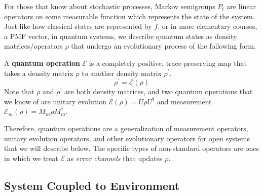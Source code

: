 \documentclass{article}
\begin{document}
  For those that know about stochastic processes, Markov semigroups $P_t$ are linear operators on some measurable function which represents the state of the system. Just like how classical states are represented by $f$, or in more elementary courses, a PMF vector, in quantum systems, we describe quantum states as density matrices/operators $\rho$ that undergo an evolutionary process of the following form. 

  \begin{definition}
    A \textbf{quantum operation} $\mathcal{E}$ is a completely positive, trace-preserving map that takes a density matrix $\rho$ to another density matrix $\rho^\prime$.
    \begin{equation}
      \rho^\prime = \mathcal{E} (\rho)
    \end{equation}
    Note that $\rho$ and $\rho^\prime$ are both density matrices, and two quantum operations that we know of are unitary evolution  $\mathcal{E}(\rho) = U \rho U^\dagger$ and measurement $\mathcal{E}_{m} (\rho) = M_m \rho M_m^\dagger$.
  \end{definition}

  Therefore, quantum operations are a generalization of measurement operators, unitary evolution operators, and other evolutionary operators for open systems that we will describe below. The specific types of non-standard operators are ones in which we treat $\mathcal{E}$ as \textit{error channels} that updates $\rho$. 

  \subsection{System Coupled to Environment}
\end{document}
